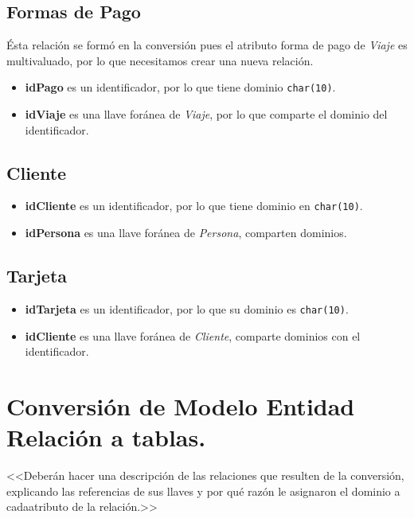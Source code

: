 \documentclass[11pt]{article}
\begin{document}
\subsection*{Formas de Pago}
\label{sec:orgc0a70e7}
Ésta relación se formó en la conversión pues el atributo forma de pago de \emph{Viaje} es multivaluado, por lo que
necesitamos crear una nueva relación.
\begin{itemize}
\item \textbf{idPago} es un identificador, por lo que tiene dominio \texttt{char(10)}.
\item \textbf{idViaje} es una llave foránea de \emph{Viaje}, por lo que comparte el dominio del identificador.
\end{itemize}
\subsection*{Cliente}
\label{sec:org9c372e5}
\begin{itemize}
\item \textbf{idCliente} es un identificador, por lo que tiene dominio en \texttt{char(10)}.
\item \textbf{idPersona} es una llave foránea de \emph{Persona}, comparten dominios.
\end{itemize}
\subsection*{Tarjeta}
\label{sec:org542e61c}
\begin{itemize}
\item \textbf{idTarjeta} es un identificador, por lo que su dominio es \texttt{char(10)}.
\item \textbf{idCliente} es una llave foránea de \emph{Cliente}, comparte dominios con el identificador.
\end{itemize}

\section*{Conversión de Modelo Entidad Relación a tablas.}
<<Deberán hacer una descripción de las relaciones que resulten de la conversión, explicando las referencias de sus llaves y por qué razón le asignaron el dominio a cadaatributo de la relación.>>
\end{document}
